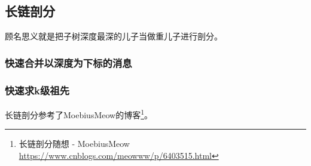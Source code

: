 \subsection{长链剖分}

顾名思义就是把子树深度最深的儿子当做重儿子进行剖分。

\subsubsection{快速合并以深度为下标的消息}

\subsubsection{快速求k级祖先}

长链剖分参考了MoebiusMeow的博客\footnote{长链剖分随想 - MoebiusMeow
    \url{https://www.cnblogs.com/meowww/p/6403515.html}
}。
